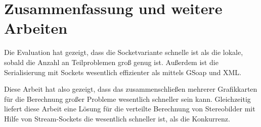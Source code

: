 \documentclass[conference]{IEEEtran}
\begin{document}
%






\section{Zusammenfassung und weitere Arbeiten}
Die Evaluation hat gezeigt, dass die Socketvariante schnelle ist als die lokale, sobald die Anzahl an Teilproblemen groß genug ist. Außerdem ist die Serialisierung mit Sockets wesentlich effizienter als mittels GSoap und XML.

Diese Arbeit hat also gezeigt, dass das zusammenschließen mehrerer Grafikkarten für die Berechnung großer Probleme wesentlich schneller sein kann. Gleichzeitig liefert diese Arbeit eine Lösung für die verteilte Berechnung von Stereobilder mit Hilfe von Stream-Sockets die wesentlich schneller ist, als die Konkurrenz. %
\end{document}
